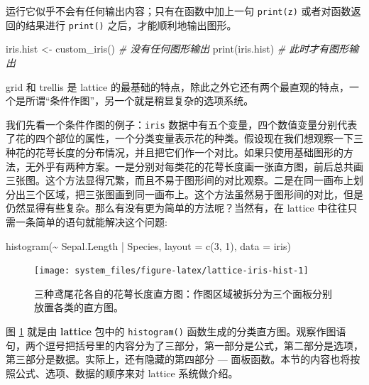 \documentclass[
  b5paper,
  UTF8,twoside]{book}
\newenvironment{Shaded}{\begin{snugshade}}{\end{snugshade}}
\newcommand{\AttributeTok}[1]{\textcolor[rgb]{0.77,0.63,0.00}{#1}}
\newcommand{\CommentTok}[1]{\textcolor[rgb]{0.56,0.35,0.01}{\textit{#1}}}
\newcommand{\DecValTok}[1]{\textcolor[rgb]{0.00,0.00,0.81}{#1}}
\newcommand{\FunctionTok}[1]{\textcolor[rgb]{0.00,0.00,0.00}{#1}}
\newcommand{\NormalTok}[1]{#1}
\newcommand{\OtherTok}[1]{\textcolor[rgb]{0.56,0.35,0.01}{#1}}
\newcommand{\SpecialCharTok}[1]{\textcolor[rgb]{0.00,0.00,0.00}{#1}}
\begin{document}
运行它似乎不会有任何输出内容；只有在函数中加上一句 \texttt{print(z)} 或者对函数返回的结果进行 \texttt{print()} 之后，才能顺利地输出图形。

\begin{Shaded}
\begin{Highlighting}[]
\NormalTok{iris.hist }\OtherTok{\textless{}{-}} \FunctionTok{custom\_iris}\NormalTok{() }\CommentTok{\# 没有任何图形输出}
\FunctionTok{print}\NormalTok{(iris.hist) }\CommentTok{\# 此时才有图形输出}
\end{Highlighting}
\end{Shaded}

grid 和 trellis 是 lattice 的最基础的特点，除此之外它还有两个最直观的特点，一个是所谓``条件作图''，另一个就是稍显复杂的选项系统。

我们先看一个条件作图的例子：\texttt{iris} 数据中有五个变量，四个数值变量分别代表了花的四个部位的属性，一个分类变量表示花的种类。假设现在我们想观察一下三种花的花萼长度的分布情况，并且把它们作一个对比。如果只使用基础图形的方法，无外乎有两种方案。一是分别对每类花的花萼长度画一张直方图，前后总共画三张图。这个方法显得冗繁，而且不易于图形间的对比观察。二是在同一画布上划分出三个区域，把三张图画到同一画布上。这个方法虽然易于图形间的对比，但是仍然显得有些复杂。那么有没有更为简单的方法呢？当然有，在 lattice 中往往只需一条简单的语句就能解决这个问题:

\begin{Shaded}
\begin{Highlighting}[]
\FunctionTok{histogram}\NormalTok{(}\SpecialCharTok{\textasciitilde{}}\NormalTok{ Sepal.Length }\SpecialCharTok{|}\NormalTok{ Species, }\AttributeTok{layout =} \FunctionTok{c}\NormalTok{(}\DecValTok{3}\NormalTok{, }\DecValTok{1}\NormalTok{), }\AttributeTok{data =}\NormalTok{ iris)}
\end{Highlighting}
\end{Shaded}

\begin{figure}

{\centering \texttt{[image: system\_files/figure-latex/lattice-iris-hist-1]} 

}

\caption[三种鸢尾花各自的花萼长度直方图]{三种鸢尾花各自的花萼长度直方图：作图区域被拆分为三个面板分别放置各类的直方图。}\label{fig:lattice-iris-hist}
\end{figure}



图 \ref{fig:lattice-iris-hist} 就是由 \textbf{lattice} 包中的 \texttt{histogram()} 函数生成的分类直方图。观察作图语句，两个逗号把括号里的内容分为了三部分，第一部分是公式，第二部分是选项，第三部分是数据。实际上，还有隐藏的第四部分 --- 面板函数。本节的内容也将按照公式、选项、数据的顺序来对 lattice 系统做介绍。
\end{document}

